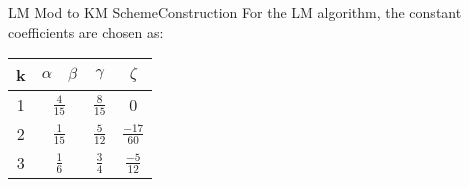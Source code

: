 \documentclass[\string~/GitHub/sthlmNordBeamerTheme/sthlmNordLightDemo.tex]{subfiles}
\begin{document}
\begin{frame}{LM Mod to KM Scheme}{Construction}
    For the LM algorithm, the constant coefficients are chosen as:
    \begin{center}
        \renewcommand{\arraystretch}{1.8}
        \begin{tabular}{||c||c | c | c | c||} 
            \hline
            k & $\alpha$ & $\beta$ & $\gamma$ & $\zeta$ \\ [0.5ex] 
            \hline\hline
            1 & \multicolumn{2}{c|}{$\frac{4}{15}$} & $\frac{8}{15}$ & 0 \\ 
            \hline
            2 & \multicolumn{2}{c|}{$\frac{1}{15}$} & $\frac{5}{12}$ & $\frac{-17}{60}$ \\
            \hline
            3 & \multicolumn{2}{c|}{$\frac{1}{6}$} & $\frac{3}{4}$ & $\frac{-5}{12}$ \\
            \hline
        \end{tabular}
        \renewcommand{\arraystretch}{1}
    \end{center}
    
\end{frame}
\end{document}
